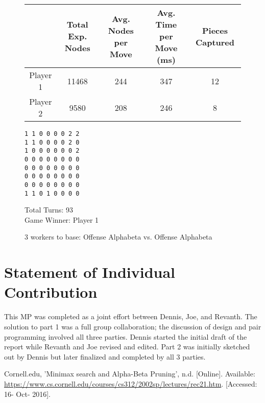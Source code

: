 \documentclass{article}
\begin{document}
\begin{figure}[H]
\begin{tabular}{|c|c|c|c|c|}
\hline 
 & Total Exp. Nodes & Avg. Nodes per Move & Avg. Time per Move (ms) & Pieces Captured \\
\hline
 Player 1 & 11468 & 244 & 347 & 12 \\
\hline
 Player 2 & 9580 & 208 & 246 & 8 \\
\hline
\end{tabular}
\begin{verbatim}
1 1 0 0 0 0 2 2 
1 1 0 0 0 0 2 0 
1 0 0 0 0 0 0 2 
0 0 0 0 0 0 0 0 
0 0 0 0 0 0 0 0 
0 0 0 0 0 0 0 0 
0 0 0 0 0 0 0 0 
1 1 0 1 0 0 0 0
\end{verbatim}
Total Turns: 93\\
Game Winner: Player 1
\caption{3 workers to base: Offense Alphabeta vs. Offense Alphabeta}
\end{figure}

\section{Statement of Individual Contribution}
This MP was completed as a joint effort between Dennis, Joe, and Revanth. The solution to part 1 was a full group collaboration; the discussion of design and pair programming involved all three parties. Dennis started the initial draft of the report while Revanth and Joe revised and edited. Part 2 was initially sketched out by Dennis but later finalized and completed by all 3 parties.

\begin{thebibliography}{9}
Cornell.edu, 'Minimax search and Alpha-Beta Pruning', n.d. [Online]. Available: \url{https://www.cs.cornell.edu/courses/cs312/2002sp/lectures/rec21.htm}. [Accessed: 16- Oct- 2016].
\end{thebibliography}
\end{document}
